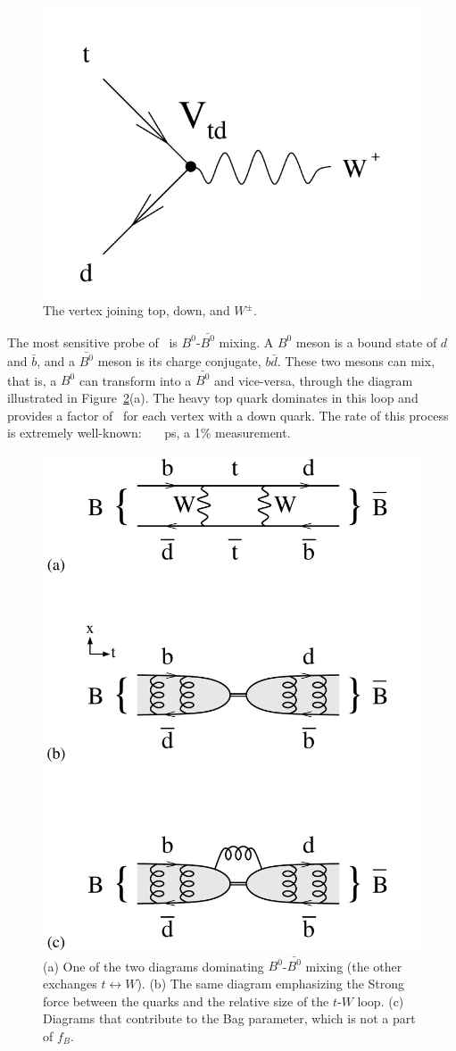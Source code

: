 \documentclass{cornell}
\begin{document}
\begin{figure}[t]
  \begin{center}
    \includegraphics[width=0.5\linewidth]{plots/vtdvertex}
  \end{center}
  \caption{\label{vtdvertex} The vertex joining top, down, and
  $W^\pm$.}
\end{figure}

The most sensitive probe of \vtd\ is $B^0$-$\bar{B^0}$ mixing.  A
$B^0$ meson is a bound state of $d$ and $\bar{b}$, and a $\bar{B^0}$
meson is its charge conjugate, $b\bar{d}$.  These two mesons can mix,
that is, a $B^0$ can transform into a $\bar{B^0}$ and vice-versa,
through the diagram illustrated in Figure~\ref{bmixing}(a).  The heavy
top quark dominates in this loop and provides a factor of \vtd\ for
each vertex with a down quark.  The rate of this process is extremely
well-known: \bork\ \PM\ \bork\ ps\inv, a 1\% measurement.

\begin{figure}[p]
  \begin{center}
    \includegraphics[width=0.7\linewidth]{plots/bmixing}
  \end{center}
  \caption{\label{bmixing} (a) One of the two diagrams dominating
  $B^0$-$\bar{B^0}$ mixing (the other exchanges $t \leftrightarrow
  W$).  (b) The same diagram emphasizing the Strong force between the
  quarks and the relative size of the $t$-$W$ loop.  (c) Diagrams that
  contribute to the Bag parameter, which is not a part of $f_B$.}
\end{figure}
\end{document}
